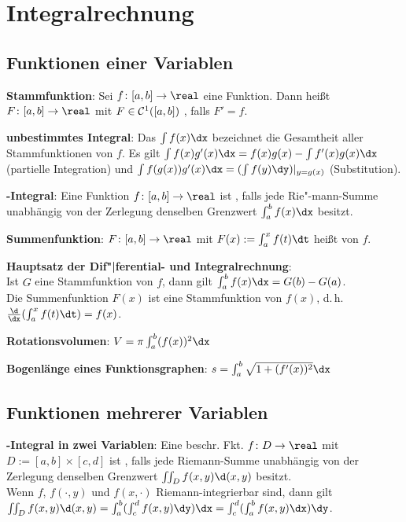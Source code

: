 \section{%
    Integralrechnung%
}

\subsection{%
    Funktionen einer Variablen%
}

\textbf{Stammfunktion}:
Sei $f\colon [a, b] \to \real$ eine Funktion.
Dann heißt $F\colon [a, b] \to \real$ mit $F \in \mathcal{C}^1([a, b])$ ,
falls $F' = f$.

\textbf{unbestimmtes Integral}:
Das  $\int f(x) \dx$ bezeichnet die Gesamtheit aller
Stammfunktionen von $f$.
Es gilt $\int f(x) g'(x) \dx = f(x) g(x) - \int f'(x) g(x) \dx$ (partielle Integration) und
$\int f(g(x)) g'(x) \dx = (\int f(y) \dy)|_{y = g(x)}$ (Substitution).

\linie

\textbf{-Integral}:
Eine Funktion $f\colon [a, b] \to \real$ ist ,
falls jede Rie"-mann-Summe unabhängig von der Zerlegung denselben Grenzwert
$\int_a^b f(x) \dx$ besitzt.

\linie

\textbf{Summenfunktion}:
$F\colon [a, b] \to \real$ mit $F(x) := \int_a^x f(t) \dt$ heißt  von $f$.

\textbf{Hauptsatz der Dif"|ferential- und Integralrechnung}:\\
Ist $G$ eine Stammfunktion von $f$, dann gilt $\int_a^b f(x) \dx = G(b) - G(a)$.\\
Die Summenfunktion $F(x)$ ist eine Stammfunktion von $f(x)$,
d.\,h. $\frac{\d}{\dx} (\int_a^x f(t) \dt) = f(x)$.

\linie

\textbf{Rotationsvolumen}:
$V = \pi \int_a^b (f(x))^2 \dx$

\textbf{Bogenlänge eines Funktionsgraphen}:
$s = \int_a^b \sqrt{1 + (f'(x))^2} \dx$

\subsection{%
    Funktionen mehrerer Variablen%
}

\textbf{-Integral in zwei Variablen}:
Eine beschr. Fkt. $f\colon D \to \real$ mit $D := [a, b] \times [c, d]$
ist , falls
jede Riemann-Summe unabhängig von der Zerlegung denselben Grenzwert
$\iint_D f(x, y) \d(x,y)$ besitzt.\\
Wenn $f$, $f(\cdot, y)$ und $f(x, \cdot)$ Riemann-integrierbar sind, dann gilt\\
$\iint_D f(x, y) \d(x,y) = \int_a^b (\int_c^d f(x, y) \dy) \dx
= \int_c^d (\int_a^b f(x, y) \dx) \dy$.

